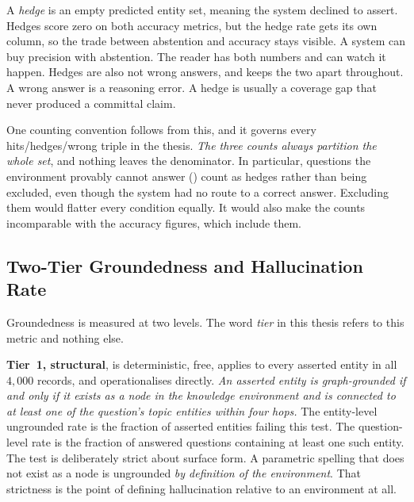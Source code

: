 A \emph{hedge} is an empty predicted entity set, meaning the system
declined to assert. Hedges score zero on both accuracy metrics, but the hedge
rate gets its own column, so the trade between abstention and accuracy stays
visible. A system can buy precision with abstention. The reader has both numbers
and can watch it happen. Hedges are also not wrong answers, and
 keeps the two apart throughout. A wrong answer is a
reasoning error. A hedge is usually a coverage gap that never produced a
committal claim.

One counting convention follows from this, and it governs every
hits/hedges/wrong triple in the thesis. \emph{The three counts always partition
the whole set}, and nothing leaves the denominator. In particular, questions the
environment provably cannot answer () count as hedges
rather than being excluded, even though the system had no route to a correct
answer. Excluding them would flatter every condition equally. It would also make
the counts incomparable with the accuracy figures, which include them.

\subsection{Two-Tier Groundedness and Hallucination
Rate}\label{sec:groundedness-metric}

Groundedness is measured at two levels. The
word \emph{tier} in this thesis refers to this metric and
nothing else.

\textbf{Tier~1, structural}, is deterministic, free, applies to every asserted
entity in all $4{,}000$ records, and operationalises
 directly. \emph{An asserted entity is
graph-grounded if and only if it exists as a node in the knowledge environment
and is connected to at least one of the question's topic entities within four
hops.} The entity-level ungrounded rate is the fraction of asserted entities
failing this test. The question-level rate is the fraction of answered questions
containing at least one such entity. The test is deliberately strict about
surface form. A parametric spelling that does not exist as a node is ungrounded
\emph{by definition of the environment}. That strictness is the point of
defining hallucination relative to an environment at all.

